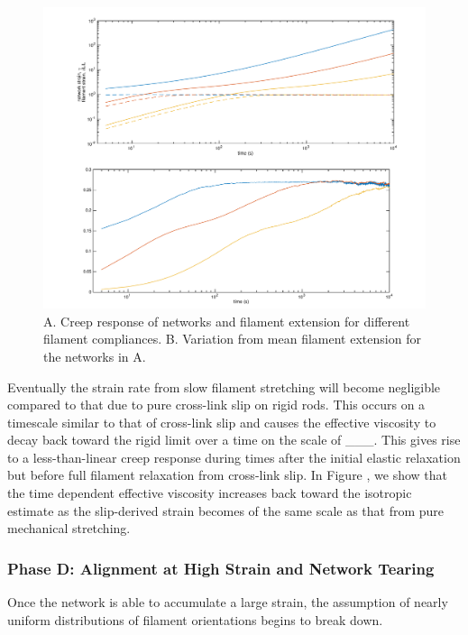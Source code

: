 \documentclass[pre,reprint]{revtex4-1}
\begin{document}
\begin{figure}[h!]
\centering
\includegraphics[width=\hsize]{glass_relax}
\caption{\label{fig:glass_relax} A. Creep response of networks and filament extension for different filament compliances.  B. Variation from mean filament extension for the networks in A. }
\end{figure}



Eventually the strain rate from slow filament stretching will become negligible compared to that due to pure cross-link slip on rigid rods.  This occurs on a timescale similar to that of cross-link slip and causes the effective viscosity to decay back toward the rigid limit over a time on the scale of \_\_\_.  This gives rise to a less-than-linear creep response during times after the initial elastic relaxation but before full filament relaxation from cross-link slip.  In Figure , we show that the time dependent effective viscosity increases back toward the isotropic estimate as the slip-derived strain becomes of the same scale as that from pure mechanical stretching.



\subsubsection{Phase D: Alignment at High Strain and Network Tearing}

Once the network is able to accumulate a large strain, the assumption of nearly uniform distributions of filament orientations begins to break down.
\end{document}
